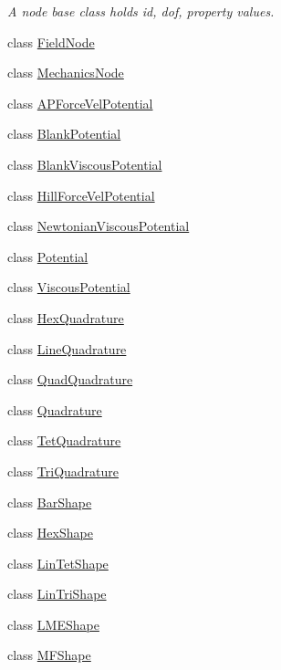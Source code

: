 \begin{DoxyCompactItemize}
\begin{DoxyCompactList}\small\item\em A node base class holds id, dof, property values. \item\end{DoxyCompactList}\item 
class \hyperlink{classvoom_1_1_field_node}{FieldNode}
\item 
class \hyperlink{classvoom_1_1_mechanics_node}{MechanicsNode}
\item 
class \hyperlink{classvoom_1_1_a_p_force_vel_potential}{APForceVelPotential}
\item 
class \hyperlink{classvoom_1_1_blank_potential}{BlankPotential}
\item 
class \hyperlink{classvoom_1_1_blank_viscous_potential}{BlankViscousPotential}
\item 
class \hyperlink{classvoom_1_1_hill_force_vel_potential}{HillForceVelPotential}
\item 
class \hyperlink{classvoom_1_1_newtonian_viscous_potential}{NewtonianViscousPotential}
\item 
class \hyperlink{classvoom_1_1_potential}{Potential}
\item 
class \hyperlink{classvoom_1_1_viscous_potential}{ViscousPotential}
\item 
class \hyperlink{classvoom_1_1_hex_quadrature}{HexQuadrature}
\item 
class \hyperlink{classvoom_1_1_line_quadrature}{LineQuadrature}
\item 
class \hyperlink{classvoom_1_1_quad_quadrature}{QuadQuadrature}
\item 
class \hyperlink{classvoom_1_1_quadrature}{Quadrature}
\item 
class \hyperlink{classvoom_1_1_tet_quadrature}{TetQuadrature}
\item 
class \hyperlink{classvoom_1_1_tri_quadrature}{TriQuadrature}
\item 
class \hyperlink{classvoom_1_1_bar_shape}{BarShape}
\item 
class \hyperlink{classvoom_1_1_hex_shape}{HexShape}
\item 
class \hyperlink{classvoom_1_1_lin_tet_shape}{LinTetShape}
\item 
class \hyperlink{classvoom_1_1_lin_tri_shape}{LinTriShape}
\item 
class \hyperlink{classvoom_1_1_l_m_e_shape}{LMEShape}
\item 
class \hyperlink{classvoom_1_1_m_f_shape}{MFShape}
\item 

\end{DoxyCompactItemize}

